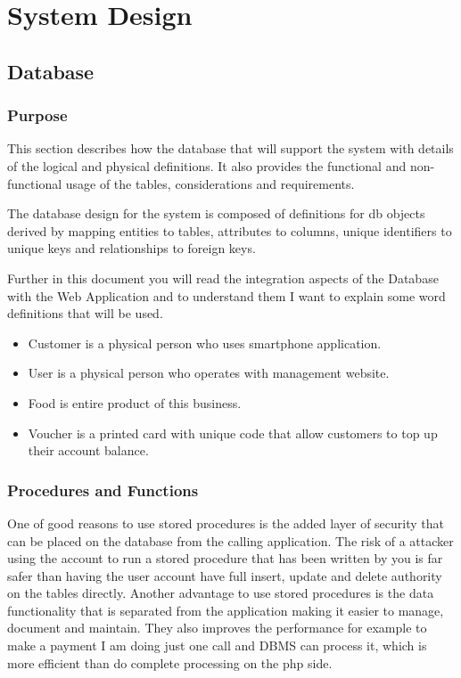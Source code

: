 
\chapter{System Design}	%
  \section{Database}
    \subsection{Purpose}

This section describes how the database that will support the system with details of the logical and physical definitions. It also provides the functional and non-functional usage of the tables, considerations and requirements.

The database design for the system is composed of definitions for db objects derived by mapping entities to tables, attributes to columns, unique identifiers to unique keys and relationships to foreign keys. 

Further in this document you will read the integration aspects of the Database with the Web Application and to understand them I want to explain some word definitions that will be used.
\\
\begin{itemize}
\item Customer is a physical person who uses smartphone application.

\item User is a physical person who operates with management website.

\item Food is entire product of this business.

\item Voucher is a printed card with unique code that allow customers to top up their account balance.
\end{itemize}
    \subsection{Procedures and Functions}
One of good reasons to use stored procedures is the added layer of security that can be placed on the database from the calling application. The risk of a attacker using the account to run a stored procedure that has been written by you is far safer than having the user account have full insert, update and delete authority on the tables directly. Another advantage to use stored procedures is the data functionality that is separated from the application making it easier to manage, document and maintain. They also improves the performance for example to make a payment I am doing just one call and DBMS can process it, which is more efficient than do complete processing on the php side.
\\


